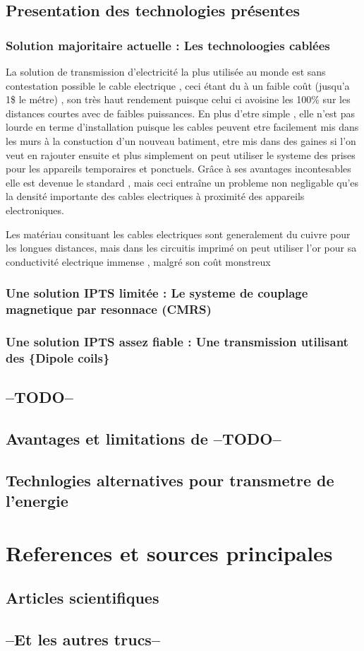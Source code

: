 \documentclass[12pt]{report}
\begin{document}
\section{Presentation des technologies présentes}
\subsection{Solution majoritaire actuelle : Les technoloogies cablées}
	La solution de transmission d'electricité la plus utilisée au monde est sans contestation possible le cable electrique , ceci étant du à un faible coût (jusqu'a 1\$ le métre) , son très haut rendement puisque celui ci avoisine les 100\% sur les distances courtes avec de faibles puissances. En plus d'etre simple , elle n'est pas lourde en terme d'installation puisque les cables peuvent etre facilement mis dans les murs à la constuction d'un nouveau batiment, etre mis dans des gaines si l'on veut en rajouter ensuite et plus simplement on peut utiliser le systeme des prises pour les appareils temporaires et ponctuels. Grâce à ses avantages incontesables elle est devenue le standard , mais ceci entraîne un probleme non negligable qu'es la densité importante des cables electriques à proximité des appareils electroniques. %
	
	Les matériau consituant les cables electriques sont generalement du cuivre pour les longues distances, mais dans les circuitis imprimé on peut utiliser l'or pour sa conductivité electrique immense , malgré son coût monstreux 
\subsection{Une solution IPTS limitée : Le systeme de couplage magnetique par resonnace (CMRS)}
\subsection{Une solution IPTS assez fiable : Une transmission utilisant des \{Dipole coils\}}
\section{--TODO--} %
\section{Avantages et limitations de --TODO--}
\section{Technlogies alternatives pour transmetre de l'energie}

\chapter{References et sources principales}
\section{Articles scientifiques}
\section{--Et les autres trucs--}
\end{document}

